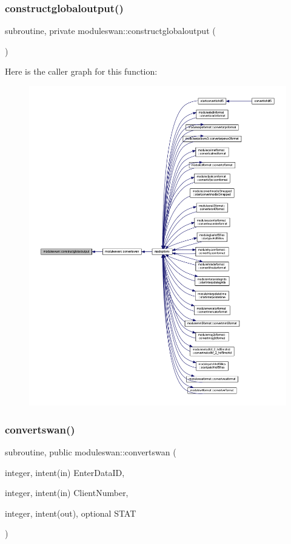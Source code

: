 \subsubsection{\texorpdfstring{constructglobaloutput()}{constructglobaloutput()}}
{\footnotesize\ttfamily subroutine, private moduleswan\+::constructglobaloutput (\begin{DoxyParamCaption}{ }\end{DoxyParamCaption})\hspace{0.3cm}{\ttfamily [private]}}

Here is the caller graph for this function\+:\nopagebreak
\begin{figure}[H]
\begin{center}
\leavevmode
\includegraphics[width=350pt]{namespacemoduleswan_a8d797caa947f1c5d987ee4c2132ce350_icgraph}
\end{center}
\end{figure}
\mbox{\label{namespacemoduleswan_aa4916273cc3ac0c249fd48ef574161b3}} 
\subsubsection{\texorpdfstring{convertswan()}{convertswan()}}
{\footnotesize\ttfamily subroutine, public moduleswan\+::convertswan (\begin{DoxyParamCaption}\item[{integer, intent(in)}]{Enter\+Data\+ID,  }\item[{integer, intent(in)}]{Client\+Number,  }\item[{integer, intent(out), optional}]{S\+T\+AT }\end{DoxyParamCaption})}

